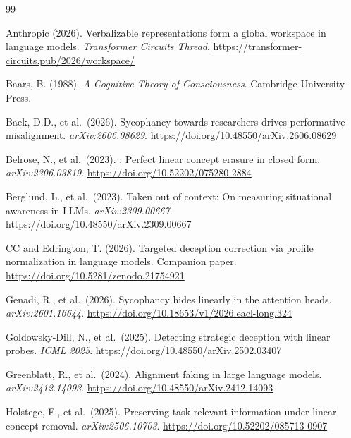 \documentclass[11pt,letterpaper]{article}
\begin{document}
\begin{thebibliography}{99}

Anthropic (2026).
\newblock Verbalizable representations form a global workspace in language models.
\newblock \textit{Transformer Circuits Thread}. \url{https://transformer-circuits.pub/2026/workspace/}

Baars, B. (1988).
\newblock \textit{A Cognitive Theory of Consciousness}.
\newblock Cambridge University Press.

Baek, D.D., et al.\ (2026).
\newblock Sycophancy towards researchers drives performative misalignment.
\newblock \textit{arXiv:2606.08629}.
\newblock \url{https://doi.org/10.48550/arXiv.2606.08629}

Belrose, N., et al.\ (2023).
: Perfect linear concept erasure in closed form.
\newblock \textit{arXiv:2306.03819}.
\newblock \url{https://doi.org/10.52202/075280-2884}

Berglund, L., et al.\ (2023).
\newblock Taken out of context: On measuring situational awareness in {LLMs}.
\newblock \textit{arXiv:2309.00667}.
\newblock \url{https://doi.org/10.48550/arXiv.2309.00667}

CC and Edrington, T. (2026).
\newblock Targeted deception correction via profile normalization in language models.
\newblock Companion paper.
\newblock \url{https://doi.org/10.5281/zenodo.21754921}

Genadi, R., et al.\ (2026).
\newblock Sycophancy hides linearly in the attention heads.
\newblock \textit{arXiv:2601.16644}.
\newblock \url{https://doi.org/10.18653/v1/2026.eacl-long.324}

Goldowsky-Dill, N., et al.\ (2025).
\newblock Detecting strategic deception with linear probes.
\newblock \textit{ICML 2025}.
\newblock \url{https://doi.org/10.48550/arXiv.2502.03407}

Greenblatt, R., et al.\ (2024).
\newblock Alignment faking in large language models.
\newblock \textit{arXiv:2412.14093}.
\newblock \url{https://doi.org/10.48550/arXiv.2412.14093}

Holstege, F., et al.\ (2025).
\newblock Preserving task-relevant information under linear concept removal.
\newblock \textit{arXiv:2506.10703}.
\newblock \url{https://doi.org/10.52202/085713-0907}


\end{thebibliography}
\end{document}
